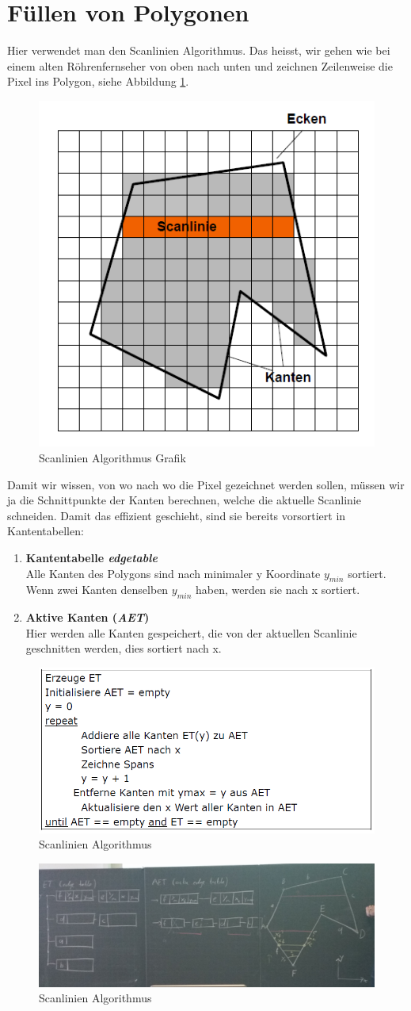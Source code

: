 \section{Füllen von Polygonen}
Hier verwendet man den Scanlinien Algorithmus. Das heisst, wir gehen wie bei einem alten Röhrenfernseher von oben nach unten und zeichnen Zeilenweise die Pixel ins Polygon, siehe Abbildung \ref{scanlinie}. 
\begin{figure}[!ht]
	\centering
	\includegraphics[width=0.4\linewidth]{fig/scanlinie}
	\caption{Scanlinien Algorithmus Grafik}
	\label{scanlinie}
\end{figure}
Damit wir wissen, von wo nach wo die Pixel gezeichnet werden sollen, müssen wir ja die Schnittpunkte der Kanten berechnen, welche die aktuelle Scanlinie schneiden. Damit das effizient geschieht, sind sie bereits vorsortiert in Kantentabellen:
\begin{enumerate}
	\item \textbf{Kantentabelle \textit{edgetable}}\\
	Alle Kanten des Polygons sind nach minimaler y Koordinate \(y_{min}\) sortiert. Wenn zwei Kanten denselben \(y_{min}\) haben, werden sie nach x sortiert.
	\item \textbf{Aktive Kanten (\textit{AET})}\\
	Hier werden alle Kanten gespeichert, die von der aktuellen Scanlinie geschnitten werden, dies sortiert nach x.
\end{enumerate}
\begin{figure}[!ht]
	\centering
	\includegraphics[width=0.5\linewidth]{fig/scanlinie_algo}
	\caption{Scanlinien Algorithmus}
	\label{scanlinie_algo}
\end{figure}
\begin{figure}
\centering
\includegraphics[width=0.7\linewidth]{fig/scanlinie_tafel}
\caption{Scanlinien Algorithmus}
\label{fig:scanlinie_tafel}
\end{figure}

